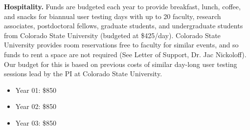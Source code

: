 \documentclass[pdftex,english,11pt,parskip=half]{scrartcl}
\begin{document}
\noindent \textbf{Hospitality.} Funds are budgeted each year to provide breakfast, lunch, coffee, and snacks for biannual user testing days with up to 20 faculty, research associates, postdoctoral fellows, graduate students, and undergraduate students from Colorado State University (budgeted at \$425/day). Colorado State University provides room reservations free to faculty for similar events, and so funds to rent a space are not required (See Letter of Support, Dr. Jac Nickoloff). Our budget for this is based on previous costs of similar day-long user testing sessions lead by the PI at Colorado State University.
\begin{itemize}
\item Year 01: \$850
\item Year 02: \$850
\item Year 03: \$850
\end{itemize}
\end{document}
